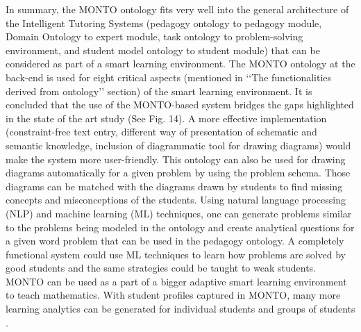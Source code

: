 \documentclass[journal]{vgtc}                %
\begin{document}
  In summary, the MONTO ontology fits very well into the general architecture of the Intelligent Tutoring Systems (pedagogy ontology to pedagogy module, Domain Ontology to expert module, task ontology to problem-solving environment, and student model ontology to student module) that can be considered as part of a smart learning environment. The MONTO ontology at the back-end is used for eight critical aspects (mentioned in ‘‘The functionalities derived from ontology’’ section) of the smart learning environment. It is concluded that the use of the MONTO-based system bridges the gaps highlighted in the state of the art study (See Fig. 14). A more effective implementation (constraint-free text entry, different way of presentation of schematic and semantic knowledge, inclusion of diagrammatic tool for drawing diagrams) would make the system more user-friendly. This ontology can also be used for drawing diagrams automatically for a given problem by using the problem schema. Those diagrams can be matched with the diagrams drawn by students to find missing concepts and misconceptions of the students. Using natural language processing (NLP) and machine learning (ML) techniques, one can generate problems similar to the problems being modeled in the ontology and create analytical questions for a given word problem that can be used in the pedagogy ontology. A completely functional system could use ML techniques to learn how problems are solved by good students and the same strategies could be taught to weak students. MONTO can be used as a part of a bigger adaptive smart learning environment to teach mathematics. With student profiles captured in MONTO, many more learning analytics can be generated for individual students and groups of students \cite{Lalingkar2014}.
\end{document}
